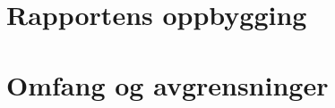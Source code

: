      
    
    
    
    
    
    \section{Rapportens oppbygging}
    
    
    
    
    
    \section{Omfang og avgrensninger}



